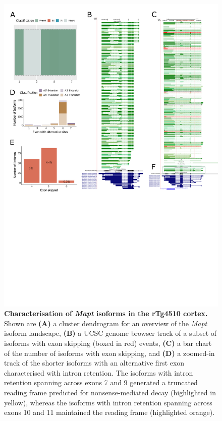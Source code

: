 \begin{figure}[htp]
	\centering
	\includegraphics[page=5,trim={0 10cm 0 0},scale = 0.85]{Figures/TargetGenes_Annotation_Portrait.pdf}
	\captionsetup{width=0.95\textwidth}
	\caption[Characterisation of \textit{Mapt} isoforms in the rTg4510 cortex]%
	{\textbf{Characterisation of \textit{Mapt} isoforms in the rTg4510 cortex.} Shown are \textbf{(A)} a cluster dendrogram for an overview of the \textit{Mapt} isoform landscape, \textbf{(B)} a UCSC genome browser track of a subset of isoforms with exon skipping (boxed in red) events, \textbf{(C)} a bar chart of the number of isoforms with exon skipping, and \textbf{(D)} a zoomed-in track of the shorter isoforms with an alternative first exon characterised with intron retention. The isoforms with intron retention spanning across exons 7 and 9 generated a truncated reading frame predicted for nonsense-mediated decay (highlighted in yellow), whereas the isoforms with intron retention spanning across exons 10 and 11 maintained the reading frame (highlighted orange).}    
	\label{fig:mapt}
\end{figure}
\restoregeometry

